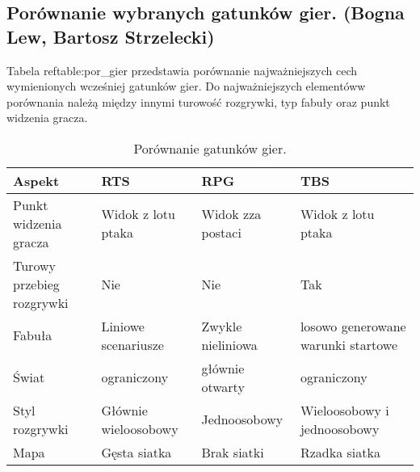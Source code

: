 \subsection{Porównanie wybranych gatunków gier. (Bogna Lew, Bartosz Strzelecki)}
Tabela ref{table:por_gier} przedstawia porównanie najważniejszych cech wymienionych wcześniej gatunków gier. Do
najważniejszych elementóww porównania należą między innymi turowość rozgrywki, typ fabuły oraz punkt widzenia gracza.

\begin{table}[h]\label{table:por_gier}
\caption{Porównanie gatunków gier.}
\begin{center}
\begin{tabular}{| m{11em} | m{10em} | m{10em} | m{10em}|} 
 \hline
 Aspekt & RTS & RPG & TBS \\
 \hline \hline
 Punkt widzenia gracza & Widok z lotu ptaka & Widok zza postaci & Widok z lotu ptaka \\
 \hline
 Turowy przebieg rozgrywki & Nie & Nie & Tak \\
 \hline
 Fabuła & Liniowe scenariusze & Zwykle nieliniowa & losowo generowane warunki startowe \\
 \hline
 Świat & ograniczony & głównie otwarty & ograniczony \\
 \hline
 Styl rozgrywki & Głównie wieloosobowy & Jednoosobowy & Wieloosobowy i jednoosobowy \\
 \hline
 Mapa & Gęsta siatka & Brak siatki & Rzadka siatka \\
 \hline
\end{tabular}
\end{center}
\label{fig:teng} 
\end{table}

